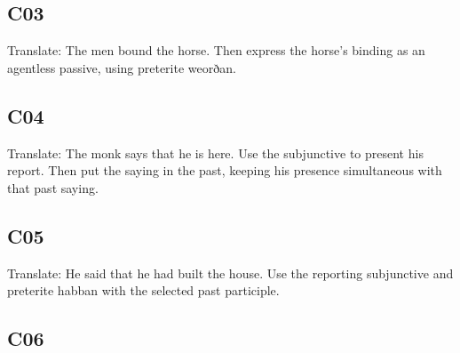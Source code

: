\subsection*{C03}

\par\begin{minipage}{\linewidth}\raggedright
Translate: The men bound the horse. Then express the horse’s binding as an agentless passive, using preterite weorðan.

\end{minipage}\par\addvspace{4pt}

\subsection*{C04}

\par\begin{minipage}{\linewidth}\raggedright
Translate: The monk says that he is here. Use the subjunctive to present his report. Then put the saying in the past, keeping his presence simultaneous with that past saying.

\end{minipage}\par\addvspace{4pt}

\subsection*{C05}

\par\begin{minipage}{\linewidth}\raggedright
Translate: He said that he had built the house. Use the reporting subjunctive and preterite habban with the selected past participle.

\end{minipage}\par\addvspace{4pt}

\subsection*{C06}

